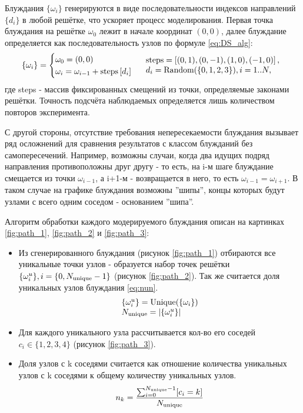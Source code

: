 Блуждания $\{ \omega_ i \}$ генерируются в виде последовательности индексов направлений $ \{d_{i}\} $ в любой решётке, что ускоряет процесс моделирования. 
Первая точка блуждания на решётке $\omega_{0}$ лежит в начале координат $(0,0)$, далее блуждание определяется как последовательность узлов по формуле \eqref{eq:DS_alg}:
\begin{equation}
\{ \omega_i \} = 
\begin{cases}
\omega_{0} = (0,0) \\
\omega_{i} = \omega_{i-1} +\textup{steps}\left[d_{i}\right] 
\end{cases}
\begin{array}{l}
\textup{steps} = \left[(0,1), (0,-1), (1,0), (-1,0)\right], \\
d_i = \textup{Random}(\{0,1,2,3\}), i = 1..N,
\end{array}
\label{eq:DS_alg}
\end{equation}
где steps - массив фиксированных смещений из точки, определяемые законами решётки. 
Точность подсчёта наблюдаемых определяется лишь количеством повторов эксперимента.

С другой стороны, отсутствие требования непересекаемости блуждания вызывает ряд осложнений для сравнения результатов с классом блужданий без самопересечений. 
Например, возможны случаи, когда два идущих подряд направления противоположны друг другу - то есть, на i-м шаге блуждание смещается из точки $\omega_{i-1}$, а i+1-м - возвращается в него, то есть $\omega_{i-1} = \omega_{i+1}$.
В таком случае на графике блуждания возможны ''шипы'', концы которых будут узлами с всего одним соседом - основанием ''шипа''. 



Алгоритм обработки каждого модерируемого блуждания описан на картинках \ref{fig:path_1}, \ref{fig:path_2} и \ref{fig:path_3}:
\begin{itemize}
    \item Из сгенерированного блуждания (рисунок \ref{fig:path_1}) отбираются все уникальные точки узлов - образуется набор точек решётки $\{\omega^u_i\}, i = \{0, N_{\textup{unique}}-1\}$ (рисунок \ref{fig:path_2}). Так же считается доля уникальных узлов блуждания \eqref{eq:nun}.
	\begin{equation}
	\begin{array}{l}
	\{ \omega^u_i \} = \textup{Unique}( \{ \omega_i \} ) \\
	N_{\textup{unique}} = |\{ \omega^u_i \}|
	\end{array}
	\label{eq:w_u}
	\end{equation}
    \item Для каждого уникального узла рассчитывается кол-во его соседей $c_i \in \{1,2,3,4\}$  (рисунок \ref{fig:path_3}).
    \item Доля узлов с k соседями считается как отношение количества уникальных узлов с k соседями к общему количеству уникальных узлов.
	\begin{equation}
	n_k = \frac{\sum_{i=0}^{N_{\textup{unique}}-1}[c_i = k]}{N_{\textup{unique}}}
	\label{eq:n_i}
	\end{equation}
\end{itemize}

